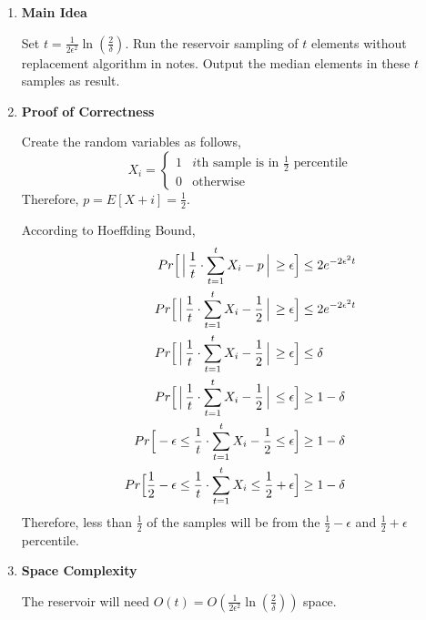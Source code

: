 \documentclass[11pt]{article}
\newenvironment{qparts}{\begin{enumerate}[{(}a{)}]}{\end{enumerate}}
\begin{document}
\begin{qparts}
	\item \textbf{Main Idea}
	
	Set $t = \frac{1}{2 \epsilon^2} \ln (\frac{2}{\delta})$. Run the reservoir sampling of $t$ elements without replacement algorithm in notes. Output the median elements in these $t$ samples as result. 

	
	\item \textbf{Proof of Correctness}
	
	Create the random variables as follows,
	\[
		X_i=
		\begin{cases}
		1& i\text{th sample is in }\frac{1}{2}\text{ percentile}\\
		0& \text{otherwise}
		\end{cases}
	\]
	Therefore, $p = E[X+i] = \frac{1}{2}$.
	
	According to Hoeffding Bound,
	\begin{align*}
		Pr\Big[\Big \arrowvert \frac{1}{t} \cdot \sum_{t=1}^t X_i - p \Big \arrowvert \ge \epsilon \Big] 
		&\le 
		2e^{-2\epsilon^2t}\\
		Pr\Big[\Big \arrowvert \frac{1}{t} \cdot \sum_{t=1}^t X_i - \frac{1}{2} \Big \arrowvert \ge \epsilon \Big] 
		&\le 
		2e^{-2\epsilon^2t}\\
		Pr\Big[\Big \arrowvert \frac{1}{t} \cdot \sum_{t=1}^t X_i - \frac{1}{2} \Big \arrowvert \ge \epsilon \Big] 
		&\le 
		\delta\\
		Pr\Big[\Big \arrowvert \frac{1}{t} \cdot \sum_{t=1}^t X_i - \frac{1}{2} \Big \arrowvert \le \epsilon \Big] 
		&\ge
		1- \delta\\
		Pr\Big[- \epsilon \le \frac{1}{t} \cdot \sum_{t=1}^t X_i - \frac{1}{2} \le \epsilon \Big] 
		&\ge
		1- \delta\\
		Pr\Big[\frac{1}{2} - \epsilon \le \frac{1}{t} \cdot \sum_{t=1}^t X_i \le \frac{1}{2} + \epsilon \Big] 
		&\ge
		1- \delta\\
	\end{align*}
	Therefore, less than $\frac{1}{2}$ of the samples will be from the $\frac{1}{2} - \epsilon$ and $\frac{1}{2} + \epsilon$  percentile.
	
	\item \textbf{Space Complexity}
	
	The reservoir will need $O(t) = O(\frac{1}{2 \epsilon^2} \ln (\frac{2}{\delta}))$ space.
	

	
\end{qparts}
\end{document}
